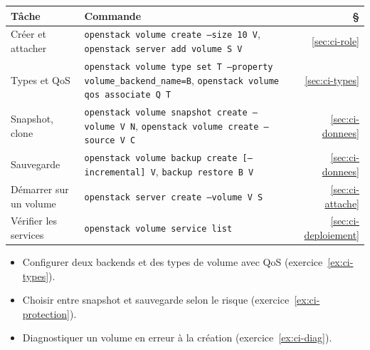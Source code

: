 \begin{center}
\renewcommand{\arraystretch}{1.35}
\begin{tabular}{@{}>{\raggedright\arraybackslash}p{4.2cm}>{\raggedright\arraybackslash}p{9.9cm}r@{}}
\toprule
\textbf{Tâche} & \textbf{Commande} & \textbf{§} \\
\midrule
Créer et attacher & \texttt{openstack volume create --size 10 V}, \texttt{openstack server add volume S V} & \ref{sec:ci-role} \\
Types et QoS & \texttt{openstack volume type set T --property volume\_backend\_name=B}, \texttt{openstack volume qos associate Q T} & \ref{sec:ci-types} \\
Snapshot, clone & \texttt{openstack volume snapshot create --volume V N}, \texttt{openstack volume create --source V C} & \ref{sec:ci-donnees} \\
Sauvegarde & \texttt{openstack volume backup create [--incremental] V}, \texttt{backup restore B V} & \ref{sec:ci-donnees} \\
Démarrer sur un volume & \texttt{openstack server create --volume V S} & \ref{sec:ci-attache} \\
Vérifier les services & \texttt{openstack volume service list} & \ref{sec:ci-deploiement} \\
\bottomrule
\end{tabular}
\end{center}

\begin{savoirfaire}
\begin{itemize}
  \item Configurer deux backends et des types de volume avec QoS (exercice~\ref{ex:ci-types}).
  \item Choisir entre snapshot et sauvegarde selon le risque (exercice~\ref{ex:ci-protection}).
  \item Diagnostiquer un volume en erreur à la création (exercice~\ref{ex:ci-diag}).
\end{itemize}
\end{savoirfaire}

